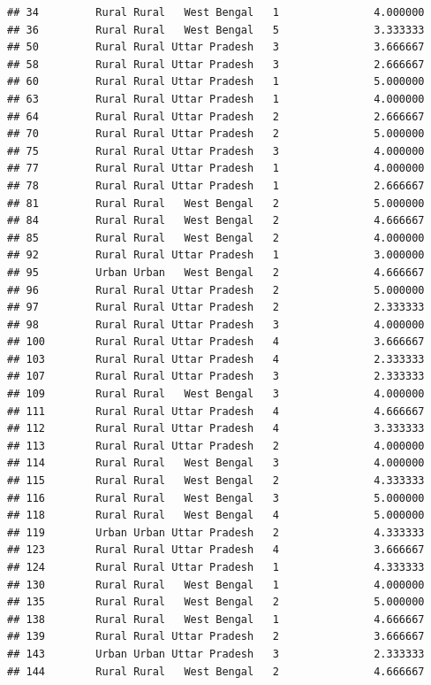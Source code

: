 \documentclass[
]{article}
\begin{document}
\begin{verbatim}
## 34         Rural Rural   West Bengal   1               4.000000
## 36         Rural Rural   West Bengal   5               3.333333
## 50         Rural Rural Uttar Pradesh   3               3.666667
## 58         Rural Rural Uttar Pradesh   3               2.666667
## 60         Rural Rural Uttar Pradesh   1               5.000000
## 63         Rural Rural Uttar Pradesh   1               4.000000
## 64         Rural Rural Uttar Pradesh   2               2.666667
## 70         Rural Rural Uttar Pradesh   2               5.000000
## 75         Rural Rural Uttar Pradesh   3               4.000000
## 77         Rural Rural Uttar Pradesh   1               4.000000
## 78         Rural Rural Uttar Pradesh   1               2.666667
## 81         Rural Rural   West Bengal   2               5.000000
## 84         Rural Rural   West Bengal   2               4.666667
## 85         Rural Rural   West Bengal   2               4.000000
## 92         Rural Rural Uttar Pradesh   1               3.000000
## 95         Urban Urban   West Bengal   2               4.666667
## 96         Rural Rural Uttar Pradesh   2               5.000000
## 97         Rural Rural Uttar Pradesh   2               2.333333
## 98         Rural Rural Uttar Pradesh   3               4.000000
## 100        Rural Rural Uttar Pradesh   4               3.666667
## 103        Rural Rural Uttar Pradesh   4               2.333333
## 107        Rural Rural Uttar Pradesh   3               2.333333
## 109        Rural Rural   West Bengal   3               4.000000
## 111        Rural Rural Uttar Pradesh   4               4.666667
## 112        Rural Rural Uttar Pradesh   4               3.333333
## 113        Rural Rural Uttar Pradesh   2               4.000000
## 114        Rural Rural   West Bengal   3               4.000000
## 115        Rural Rural   West Bengal   2               4.333333
## 116        Rural Rural   West Bengal   3               5.000000
## 118        Rural Rural   West Bengal   4               5.000000
## 119        Urban Urban Uttar Pradesh   2               4.333333
## 123        Rural Rural Uttar Pradesh   4               3.666667
## 124        Rural Rural Uttar Pradesh   1               4.333333
## 130        Rural Rural   West Bengal   1               4.000000
## 135        Rural Rural   West Bengal   2               5.000000
## 138        Rural Rural   West Bengal   1               4.666667
## 139        Rural Rural Uttar Pradesh   2               3.666667
## 143        Urban Urban Uttar Pradesh   3               2.333333
## 144        Rural Rural   West Bengal   2               4.666667

\end{verbatim}
\end{document}
